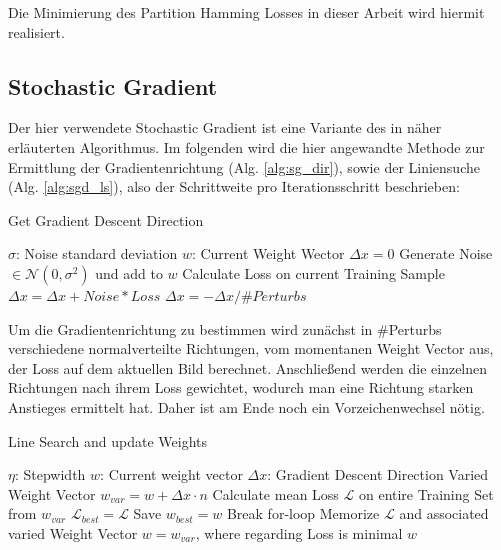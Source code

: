 Die Minimierung des Partition Hamming Losses in dieser Arbeit wird hiermit realisiert.

\subsection{Stochastic Gradient}

Der hier verwendete Stochastic Gradient ist eine Variante des in \cite{NowozinStrucLearn11} näher erläuterten Algorithmus. Im folgenden wird die hier angewandte Methode zur Ermittlung der Gradientenrichtung (Alg. \ref{alg:sg_dir}), sowie der Liniensuche (Alg. \ref{alg:sgd_ls}), also der Schrittweite pro Iterationsschritt beschrieben: \\

\begin{algorithm}[H]
\caption{Get Gradient Descent Direction}\label{alg:sg_dir}
\begin{algorithmic}[1]
	\State $\sigma$: Noise standard deviation
	\State $w$: Current Weight Wector
	\State
	\State $\Delta x = 0$
		\State Generate Noise $\in \mathcal{N}(0, \sigma^2)$ und add to $w$
		\State Calculate Loss on current Training Sample
		\State $\Delta x = \Delta x + Noise*Loss$
	\EndFor
	\State $\Delta x = -\Delta x / \#Perturbs$
	\State {}
\EndProcedure
\end{algorithmic}
\end{algorithm}

Um die Gradientenrichtung zu bestimmen wird zunächst in \#Perturbs verschiedene normalverteilte Richtungen, vom momentanen Weight Vector aus, der Loss auf dem aktuellen Bild berechnet. Anschließend werden die einzelnen Richtungen nach ihrem Loss gewichtet, wodurch man eine Richtung starken Anstieges ermittelt hat. Daher ist am Ende noch ein Vorzeichenwechsel nötig.

\vspace{1cm}


\begin{algorithm}[H]
\caption{Line Search and update Weights}\label{alg:sgd_ls}
\begin{algorithmic}[1]
	\State $\eta$: Stepwidth
	\State $w$: Current weight vector
	\State $\Delta x$: Gradient Descent Direction
	\State
		\State Varied Weight Vector $w_{var} = w + \Delta x \cdot n$
		\State Calculate mean Loss $\mathcal{L}$ on entire Training Set
		\State from $w_{var}$
			\State $\mathcal{L}_{best} = \mathcal{L}$
			\State Save $w_{best} = w$
			\State Break for-loop
		\EndIf
		\State Memorize $\mathcal{L}$ and associated varied Weight Vector
	\EndFor
	\State $w = w_{var}$, where regarding Loss is minimal
	\State \Return $w$
\EndProcedure
\end{algorithmic}
\end{algorithm}

